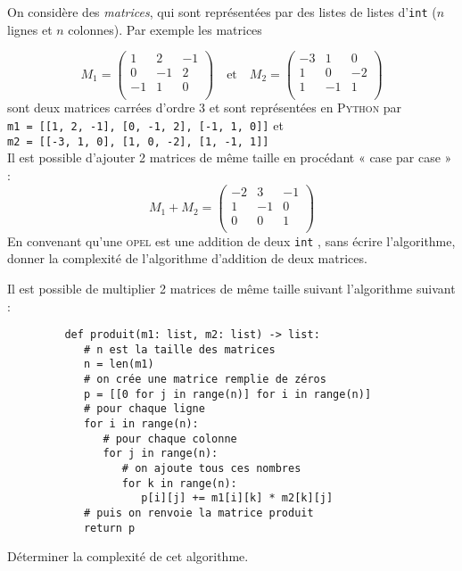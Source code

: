 \begin{exercice}
   On considère des \textit{matrices}, qui sont représentées par des listes de listes d'\texttt{int} ($n$ lignes et $n$ colonnes).
   Par exemple les matrices 

   $$M_1 = \begin{pmatrix}
         1 & 2 & -1\\
         0 & -1 & 2\\
         -1& 1 & 0\\
   \end{pmatrix}\quad\text{et}\quad M_2 = \begin{pmatrix}
         -3 & 1 & 0\\
         1 & 0 & -2\\
         1& -1 & 1\\
   \end{pmatrix}$$
   sont deux matrices carrées d'ordre 3 et sont représentées en \textsc{Python} par \\
   \texttt{m1 = [[1, 2, -1], [0, -1, 2], [-1, 1, 0]]} et\\
   \texttt{m2 = [[-3, 1, 0], [1, 0, -2], [1, -1, 1]]}\\

   Il est possible d'ajouter 2 matrices de même taille en procédant « case par case »  :
   $$M_1+M_2 = \begin{pmatrix}
         -2 & 3 & -1\\
         1 & -1 & 0\\
         0& 0 & 1\\
   \end{pmatrix}$$
   En convenant qu'une \textsc{opel} est une addition de deux \texttt{int} , sans écrire l'algorithme, donner la complexité de l'algorithme d'addition de deux matrices.
\end{exercice}
\begin{exercice}
   Il est possible de multiplier 2 matrices de même taille suivant l'algorithme suivant :
  
      \begin{verbatim}
         def produit(m1: list, m2: list) -> list:
            # n est la taille des matrices
            n = len(m1) 
            # on crée une matrice remplie de zéros
            p = [[0 for j in range(n)] for i in range(n)]
            # pour chaque ligne
            for i in range(n):
               # pour chaque colonne
               for j in range(n):
                  # on ajoute tous ces nombres
                  for k in range(n):
                     p[i][j] += m1[i][k] * m2[k][j]
            # puis on renvoie la matrice produit
            return p
      \end{verbatim}


   Déterminer la complexité de cet algorithme.
\end{exercice}
